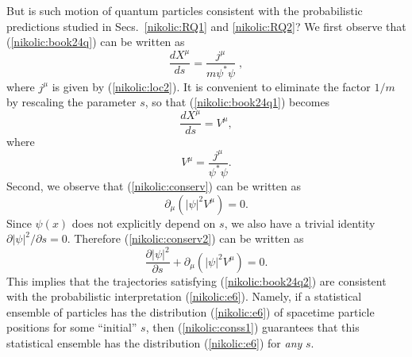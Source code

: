 \documentclass[12pt,twoside]{report} %
\begin{document}
But is such motion of quantum particles consistent with the probabilistic predictions
studied in Secs.~\ref{nikolic:RQ1} and \ref{nikolic:RQ2}? We first observe that (\ref{nikolic:book24q})
can be written as
\begin{equation}\label{nikolic:book24q1}
 \frac{dX^{\mu}}{ds}=\frac{j^{\mu}}{m\psi^*\psi} \; ,
\end{equation}
where $j^{\mu}$ is given by (\ref{nikolic:loc2}). 
It is convenient to eliminate the factor $1/m$ by rescaling the parameter $s$, so that
(\ref{nikolic:book24q1}) becomes
\begin{equation}\label{nikolic:book24q2}
 \frac{dX^{\mu}}{ds}=V^{\mu} ,
\end{equation}
where
\begin{equation}\label{nikolic:V}
V^{\mu}=\frac{j^{\mu}}{\psi^*\psi} .
\end{equation}
Second, we observe that (\ref{nikolic:conserv}) can be written as
\begin{equation}\label{nikolic:conserv2}
 \partial_{\mu}(|\psi|^2V^{\mu})=0 .
\end{equation}
Since $\psi(x)$ does not explicitly depend on $s$, we also have a trivial identity
$\partial|\psi|^2 /\partial s =0$. Therefore (\ref{nikolic:conserv2}) can be written as
 \begin{equation}\label{nikolic:conss1}
\frac{\partial|\psi|^2}{\partial s} + \partial_{\mu}(|\psi|^2V^{\mu})=0 .
\end{equation}
This implies that the trajectories satisfying (\ref{nikolic:book24q2}) are consistent with the probabilistic 
interpretation (\ref{nikolic:e6}). Namely, if a statistical ensemble of particles has the distribution
(\ref{nikolic:e6}) of spacetime particle positions for some ``initial'' $s$, then (\ref{nikolic:conss1})
guarantees that this statistical ensemble has the distribution
(\ref{nikolic:e6}) for {\em any} $s$. 
\end{document}
